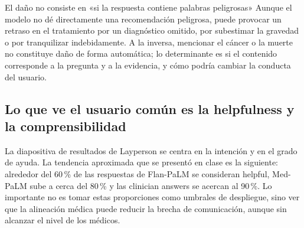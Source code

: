 

\begin{warningbox}{El daño no consiste en «si la respuesta contiene palabras peligrosas»}
Aunque el modelo no dé directamente una recomendación peligrosa, puede provocar un retraso en el tratamiento por un diagnóstico omitido, por subestimar la gravedad o por tranquilizar indebidamente. A la inversa, mencionar el cáncer o la muerte no constituye daño de forma automática; lo determinante es si el contenido corresponde a la pregunta y a la evidencia, y cómo podría cambiar la conducta del usuario.
\end{warningbox}


\subsection{Lo que ve el usuario común es la helpfulness y la comprensibilidad}

La diapositiva de resultados de Layperson se centra en la intención y en el grado de ayuda. La tendencia aproximada que se presentó en clase es la siguiente: alrededor del 60\,\% de las respuestas de Flan-PaLM se consideran helpful, Med-PaLM sube a cerca del 80\,\% y las clinician answers se acercan al 90\,\%. Lo importante no es tomar estas proporciones como umbrales de despliegue, sino ver que la alineación médica puede reducir la brecha de comunicación, aunque sin alcanzar el nivel de los médicos.


